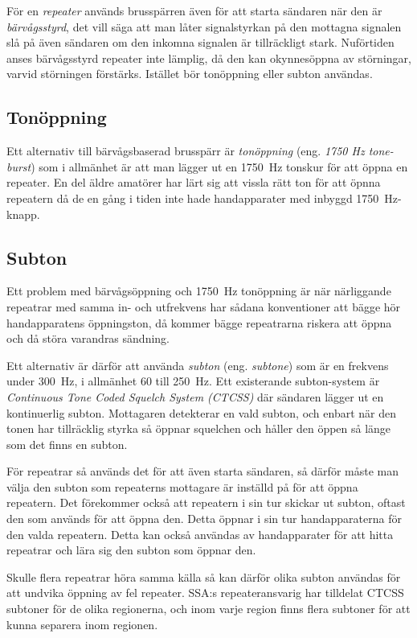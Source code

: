 För en \emph{repeater} används brusspärren även för att starta sändaren när den
är \emph{bärvågsstyrd}, det vill säga att man låter signalstyrkan på den
mottagna signalen slå på även sändaren om den inkomna signalen är tillräckligt
stark.
Nuförtiden anses bärvågsstyrd repeater inte lämplig, då den kan okynnesöppna av
störningar, varvid störningen förstärks.
Istället bör tonöppning eller subton användas.

\subsection{Tonöppning}

Ett alternativ till bärvågsbaserad brusspärr är \emph{tonöppning} (eng.
\emph{1750 Hz tone-burst}) som i allmänhet är att man lägger ut en 1750~Hz
tonskur för att öppna en repeater.
En del äldre amatörer har lärt sig att vissla rätt ton för att öpnna repeatern
då de en gång i tiden inte hade handapparater med inbyggd 1750~Hz-knapp.

\subsection{Subton}

Ett problem med bärvågsöppning och 1750~Hz tonöppning är när närliggande
repeatrar med samma in- och utfrekvens har sådana konventioner att bägge hör
handapparatens öppningston, då kommer bägge repeatrarna riskera att öppna och
då störa varandras sändning.

Ett alternativ är därför att använda \emph{subton} (eng. \emph{subtone}) som är
en frekvens under 300~Hz, i allmänhet 60 till 250~Hz.
Ett existerande subton-system är \emph{Continuous Tone Coded Squelch System
  (CTCSS)} där sändaren lägger ut en kontinuerlig subton.
Mottagaren detekterar en vald subton, och enbart när den tonen har tillräcklig
styrka så öppnar squelchen och håller den öppen så länge som det finns en
subton.

För repeatrar så används det för att även starta sändaren, så därför måste man
välja den subton som repeaterns mottagare är inställd på för att öppna
repeatern.
Det förekommer också att repeatern i sin tur skickar ut subton, oftast den som
används för att öppna den.
Detta öppnar i sin tur handapparaterna för den valda repeatern.
Detta kan också användas av handapparater för att hitta repeatrar och lära sig
den subton som öppnar den.

Skulle flera repeatrar höra samma källa så kan därför olika subton användas
för att undvika öppning av fel repeater.
SSA:s repeateransvarig har tilldelat CTCSS subtoner för de olika regionerna,
och inom varje region finns flera subtoner för att kunna separera inom
regionen.

